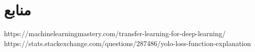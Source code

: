 \documentclass{article}
\begin{document}
%
%
%
%
%
%




\section*{منابع}
\renewcommand{\section}[2]{}%
\begin{thebibliography}{99} %


\begin{LTRitems}

\resetlatinfont

 https://machinelearningmastery.com/transfer-learning-for-deep-learning/
 https://stats.stackexchange.com/questions/287486/yolo-loss-function-explanation

\end{LTRitems}

\end{thebibliography}
\end{document}

